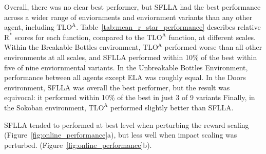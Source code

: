 Overall, there was no clear best performer, but SFLLA had the best performance across a wider range of enviornments and enviornment variants than any other agent, including  $\text{TLO}^\text{A}$. Table~\ref{tab:mean_r_star_performance} describes relative $\text{R}^*$ scores for each function, compared to the $\text{TLO}^\text{A}$ function, at different scales.  Within the Breakable Bottles environment, $\text{TLO}^\text{A}$ performed worse than all other environments at all scales, and SFLLA performed within 10\% of the best within five of nine enviornmental variants. In the Unbreakable Bottles Environment, performance between all agents except ELA was roughly equal. In the Doors environment, SFLLA was overall the best performer, but the result was equivocal: it performed within 10\% of the best in just 3 of 9 variants Finally, in the Sokoban environment, $\text{TLO}^\text{A}$ performed slightly better than SFLLA.

SFLLA tended to performed at best level when perturbing the reward scaling (Figure~\ref{fig:online_performance}a), but less well when impact scaling was perturbed. (Figure~\ref{fig:online_performance}b).